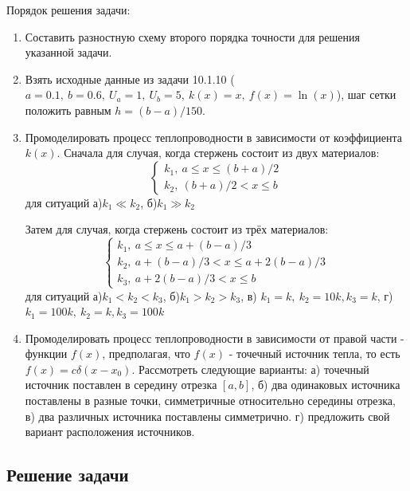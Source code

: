 \documentclass[12pt]{article}%
\begin{document}
Порядок решения задачи:
\begin{enumerate}
    \item Составить разностную схему второго порядка точности для решения указанной задачи.
    \item Взять исходные данные из задачи 10.1.10 ($a=0.1, \ b=0.6,\ U_a=1,\ U_b=5,\ k(x)=x,\ f(x)=\ln(x)$), шаг сетки положить равным $h = (b - a)/150$.
    \item Промоделировать процесс теплопроводности в зависимости от коэффициента $k(x)$. Сначала для случая, когда стержень состоит из двух материалов:
    \begin{equation*}
    \begin{cases}
        k_1,\ a \le x \le (b + a)/2 \\
        k_2,\ (b + a)/2 < x \le b
    \end{cases}
    \end{equation*}
    для ситуаций а)$k_1 \ll k_2$, б)$k_1 \gg k_2$ 
    
    Затем для случая, когда стержень состоит из трёх материалов:
    \begin{equation*}
    \begin{cases}
        k_1,\ a \le x \le a + (b - a)/3 \\
        k_2,\ a + (b - a)/3 < x \le a + 2(b - a)/3 \\
        k_3,\ a + 2(b - a)/3 < x \le b
    \end{cases}
    \end{equation*}
    для ситуаций а)$k_1 < k_2 < k_3$, б)$k_1 > k_2 > k_3$, в) $k_1 = k,\ k_2 = 10k, k_3 = k$, г)$k_1 = 100k,\ k_2 = k, k_3 = 100k$

    \item Промоделировать процесс теплопроводности в зависимости от правой части - функции $f(x)$, предполагая, что $f(x)$ - точечный источник тепла, то есть $f(x) = c \delta(x - x_0)$. Рассмотреть следующие варианты: а) точечный источник поставлен в середину отрезка $[a, b]$, б) два одинаковых источника поставлены в разные точки, симметричные относительно середины отрезка, в) два различных источника поставлены симметрично. г) предложить свой вариант расположения источников. 
\end{enumerate}


\subsection{Решение задачи}
\end{document}
